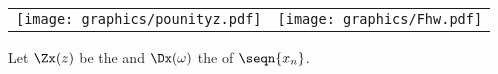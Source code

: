 \begin{center}
\begin{tabular}{cc}
  \texttt{[image: graphics/pounityz.pdf]}&\texttt{[image: graphics/Fhw.pdf]}
\end{tabular}
\end{center}
\begin{proposition}
\label{prop:tzf}
\label{prop:dsp_zone}
Let $\Zx(z)$ be the  and 
$\Dx(\omega)$ the   of $\seqn{x_n}$.
\end{proposition}
